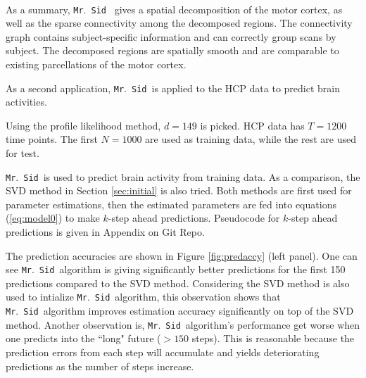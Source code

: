 \documentclass[fleqn,12pt]{article}
\let\oldref\ref
\renewcommand{\ref}[1]{(\oldref{#1})}
\newcommand{\mrsid}{{\sc \texttt{Mr}.~\texttt{Sid}}}
\begin{document}
\begin{center}
\[\begin{array}{lll}
\end{array}
\]
\label{fig:3d}
\end{center}

As a summary, \mrsid~ gives a spatial decomposition of the motor cortex, as well as the sparse connectivity among the decomposed regions. The connectivity graph contains subject-specific information and can correctly group scans by subject. The decomposed regions are spatially smooth and are comparable to existing parcellations of the motor cortex.

As a second application, \mrsid~is applied to the HCP data to predict brain activities.

Using the profile likelihood method, $d=149$ is picked. HCP data has $T=1200$ time points. The first $N = 1000$ are used as training data, while the rest are used for test. 

\mrsid~is used to predict brain activity from training data. As a comparison, the SVD method in Section \oldref{sec:initial} is also tried. Both methods are first used for parameter estimations, then the estimated parameters are fed into equations \ref{eq:model0} to make $k$-step ahead predictions. Pseudocode for $k$-step ahead predictions is given in Appendix on Git Repo. 

The prediction accuracies are shown in Figure \oldref{fig:predaccy} (left panel). One can see \mrsid~algorithm is giving significantly better predictions for the first 150 predictions compared to the SVD method. Considering the SVD method is also used to intialize \mrsid~algorithm, this observation shows that \mrsid~algorithm improves estimation accuracy significantly on top of the SVD method. Another observation is, \mrsid~algorithm's performance get worse when one predicts into the ``long" future ($>150$ steps). This is reasonable because the prediction errors from each step will accumulate and yields deteriorating predictions as the number of steps increase.
\end{document}
